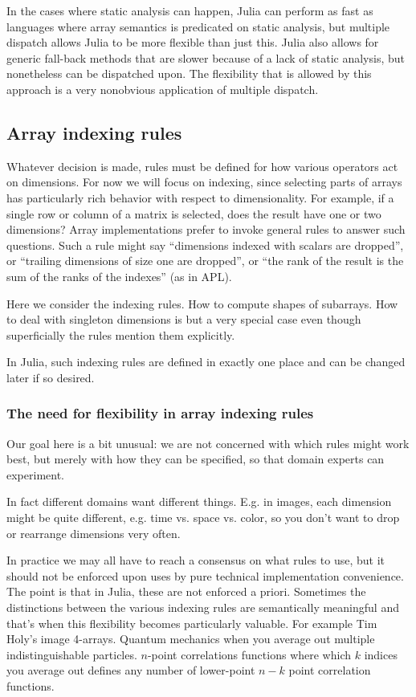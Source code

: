 \documentclass[preprint]{sigplanconf}
\begin{document}
In the cases where static analysis can happen, Julia can perform as fast as
languages where array semantics is predicated on static analysis, but multiple
dispatch allows Julia to be more flexible than just this. Julia also allows
for generic fall-back methods that are slower because of a lack of static
analysis, but nonetheless can be dispatched upon. The flexibility that is
allowed by this approach is a very nonobvious application of multiple
dispatch.

\subsection{Array indexing rules}

Whatever decision is made, rules must be defined for how various operators act
on dimensions. For now we will focus on indexing, since selecting parts of
arrays has particularly rich behavior with respect to dimensionality. For
example, if a single row or column of a matrix is selected, does the result
have one or two dimensions? Array implementations prefer to invoke general
rules to answer such questions. Such a rule might say ``dimensions indexed
with scalars are dropped'', or ``trailing dimensions of size one are
dropped'', or ``the rank of the result is the sum of the ranks of the
indexes'' (as in APL).

Here we consider the indexing rules. How to compute shapes of subarrays. How
to deal with singleton dimensions is but a very special case even though
superficially the rules mention them explicitly.

In Julia, such indexing rules are defined in exactly one place and can be
changed later if so desired.

\subsubsection{The need for flexibility in array indexing rules}

Our goal here is a bit unusual: we are not concerned with which rules might
work best, but merely with how they can be specified, so that domain experts
can experiment.

In fact different domains want different things. E.g. in images, each
dimension might be quite different, e.g. time vs. space vs. color, so you
don't want to drop or rearrange dimensions very often.

In practice we may all have to reach a consensus on what rules to use, but it
should not be enforced upon uses by pure technical implementation convenience.
The point is that in Julia, these are not enforced a priori. Sometimes the
distinctions between the various indexing rules are semantically meaningful
and that's when this flexibility becomes particularly valuable. For example
Tim Holy's image 4-arrays. Quantum mechanics when you average out multiple
indistinguishable particles. $n$-point correlations functions where which $k$
indices you average out defines any number of lower-point $n-k$ point
correlation functions.
\end{document}
